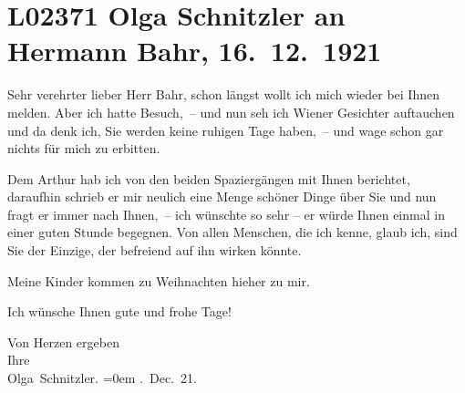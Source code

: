 

\section[Olga Schnitzler an Hermann Bahr, 16. 12. 1921]{L02371 Olga Schnitzler an Hermann Bahr, 16. 12. 1921}
\nopagebreak{}
\rehead{ }\normalsize\beginnumbering{}
\toendnotes[C]{\smallbreak\pagebreak[2]}
\toendnotes[C]{\smallbreak}
\pstart{}{\pb}Sehr verehrter
                  lieber Herr Bahr,\pend\vspace{0.5em}
\pstart
           schon längst wollt ich mich wieder bei Ihnen melden. Aber ich hatte Besuch, – und nun
               seh ich Wiener Gesichter auftauchen und da denk
               ich, Sie werden keine ruhigen Tage haben, – und wage schon gar nichts für mich zu
               erbitten.\pend
           
\pstart
           Dem Arthur hab ich von den beiden Spaziergängen
               mit Ihnen berichtet, daraufhin schrieb er mir neulich eine Menge schöner Dinge über
               Sie und nun fragt er immer nach Ihnen, – ich wünschte so sehr – er würde Ihnen einmal
               in einer guten Stunde begegnen. Von allen Menschen, die ich kenne, glaub ich, sind
               Sie der Einzige, der befreiend auf ihn wirken könnte.\pend
           
\pstart
           Meine Kinder kommen
               zu Weihnachten hieher zu mir.\pend
           
\pstart
           {\pb}Ich wünsche Ihnen gute
               und frohe Tage! \pend
           
\pstart
           Von Herzen ergeben{\\[\baselineskip]}Ihre{\\[\baselineskip]}\spacefill\mbox{Olga Schnitzler.}\pend
           \leftskip=0em{}
. Dec. 21.\pend
           \endnumbering{}  
      